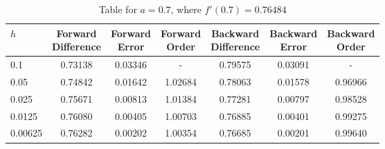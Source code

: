 \begin{table}[H]
\centering
\caption{Table for $a = 0.7$, where $f'(0.7) = 0.76484$}
\begin{tabular}{lcccccc}
\toprule
    $h$ & \makecell{Forward \\ Difference} & \makecell{Forward \\ Error} & \makecell{Forward \\ Order} & \makecell{Backward \\ Difference} & \makecell{Backward \\ Error} & \makecell{Backward \\ Order} \\
\midrule
    0.1 &                          0.73138 &                     0.03346 &                           - &                           0.79575 &                      0.03091 &                            - \\
   0.05 &                          0.74842 &                     0.01642 &                     1.02684 &                           0.78063 &                      0.01578 &                      0.96966 \\
  0.025 &                          0.75671 &                     0.00813 &                     1.01384 &                           0.77281 &                      0.00797 &                      0.98528 \\
 0.0125 &                          0.76080 &                     0.00405 &                     1.00703 &                           0.76885 &                      0.00401 &                      0.99275 \\
0.00625 &                          0.76282 &                     0.00202 &                     1.00354 &                           0.76685 &                      0.00201 &                      0.99640 \\
\bottomrule
\end{tabular}
\end{table}
